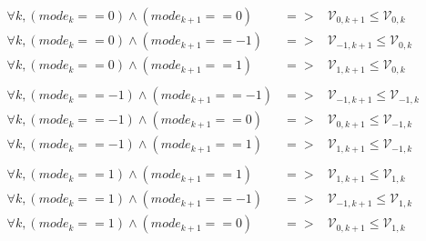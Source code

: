\begin{center}
$
\begin{array}{lcl}
\forall k, (mode_k == 0) \wedge (mode_{k+1} == 0)	& => & \mathcal{V}_{0,k+1} \leq \mathcal{V}_{0,k} \\ 
\forall k, (mode_k == 0) \wedge (mode_{k+1} == -1)	& => & \mathcal{V}_{-1,k+1} \leq \mathcal{V}_{0,k} \\ 
\forall k, (mode_k == 0) \wedge (mode_{k+1} == 1)	& => & \mathcal{V}_{1,k+1} \leq \mathcal{V}_{0,k} \\ \\

\forall k, (mode_k == -1) \wedge (mode_{k+1} == -1)	& => & \mathcal{V}_{-1,k+1} \leq \mathcal{V}_{-1,k} \\ 
\forall k, (mode_k == -1) \wedge (mode_{k+1} == 0)	& => & \mathcal{V}_{0,k+1} \leq \mathcal{V}_{-1,k} \\ 
\forall k, (mode_k == -1) \wedge (mode_{k+1} == 1)	& => & \mathcal{V}_{1,k+1} \leq \mathcal{V}_{-1,k} \\ \\

\forall k, (mode_k == 1) \wedge (mode_{k+1} == 1)	& => & \mathcal{V}_{1,k+1} \leq \mathcal{V}_{1,k} \\ 
\forall k, (mode_k == 1) \wedge (mode_{k+1} == -1)	& => & \mathcal{V}_{-1,k+1} \leq \mathcal{V}_{1,k} \\ 
\forall k, (mode_k == 1) \wedge (mode_{k+1} == 0)	& => & \mathcal{V}_{0,k+1} \leq \mathcal{V}_{1,k} \\ 
\end{array} 
$
\end{center}
